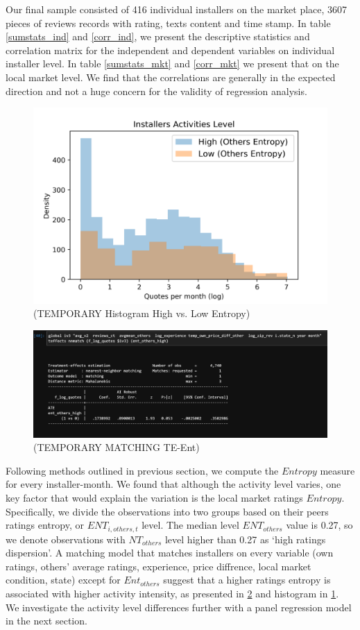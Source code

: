 \documentclass[msom,blindrev]{informs3}
\begin{document}
Our final sample consisted of 416 individual installers on the market place, 3607 pieces of reviews records with rating, texts content and time stamp. In table \ref{sumstats_ind} and \ref{corr_ind}, we present the descriptive statistics and correlation matrix for the independent and dependent variables on individual installer level.  In table \ref{sumstats_mkt} and \ref{corr_mkt} we present that on the local market level. We find that the correlations are generally in the expected direction and not a huge concern for the validity of regression analysis.




\begin{figure}
	\centering
	\includegraphics[width=0.7\linewidth]{histogram_by_high_low_ent.png}
	\caption{(TEMPORARY Histogram High vs. Low Entropy)}
	\label{histogram_by_ent_others}
\end{figure}

\begin{figure}
	\centering
	\includegraphics[width=0.7\linewidth]{match_te_ent.png}
	\caption{(TEMPORARY MATCHING TE-Ent)}
	\label{te_match_entothers}
\end{figure}

Following methods outlined in previous section, we compute the $Entropy$ measure for every installer-month. We found that although the activity level varies, one key factor that would explain the variation is the local market ratings $Entropy$. Specifically, we divide the observations into two groups based on their peers ratings entropy, or $ENT_{i,others,t}$ level. The median level $ENT_{others}$ value is 0.27, so we denote observations with $NT_{others}$ level higher than 0.27 as `high ratings dispersion'. A matching model that matches installers on every variable (own ratings, others' average ratings, experience, price diffrence, local market condition, state) except for $Ent_{others}$ suggest that a higher ratings entropy is associated with higher activity intensity, as presented in \ref{te_match_entothers} and histogram in \ref{histogram_by_ent_others}. We investigate the activity level differences further with a panel regression model in the next section. 
\end{document}
